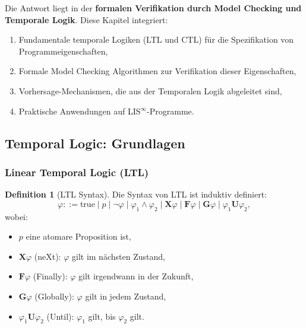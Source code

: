 \documentclass[a4paper,12pt]{article}
\theoremstyle{definition}
\newtheorem{definition}{Definition}
\begin{document}
	Die Antwort liegt in der \textbf{formalen Verifikation durch Model Checking und Temporale Logik}. Diese Kapitel integriert:
	
	\begin{enumerate}
		\item Fundamentale temporale Logiken (LTL und CTL) für die Spezifikation von Programmeigenschaften,
		\item Formale Model Checking Algorithmen zur Verifikation dieser Eigenschaften,
		\item Vorhersage-Mechanismen, die aus der Temporalen Logik abgeleitet sind,
		\item Praktische Anwendungen auf LIS$^{\infty}$-Programme.
	\end{enumerate}
	
	\subsection{Temporal Logic: Grundlagen}
	
	\subsubsection{Linear Temporal Logic (LTL)}
	
	\begin{definition}[LTL Syntax]
		\label{def:ltl_syntax}
		Die Syntax von LTL ist induktiv definiert:
		\[
		\varphi ::= \text{true} \mid p \mid \neg \varphi \mid \varphi_1 \land \varphi_2 \mid \mathbf{X}\varphi \mid \mathbf{F}\varphi \mid \mathbf{G}\varphi \mid \varphi_1 \mathbf{U} \varphi_2,
		\]
		wobei:
		\begin{itemize}
			\item $p$ eine atomare Proposition ist,
			\item $\mathbf{X}\varphi$ (neXt): $\varphi$ gilt im nächsten Zustand,
			\item $\mathbf{F}\varphi$ (Finally): $\varphi$ gilt irgendwann in der Zukunft,
			\item $\mathbf{G}\varphi$ (Globally): $\varphi$ gilt in jedem Zustand,
			\item $\varphi_1 \mathbf{U} \varphi_2$ (Until): $\varphi_1$ gilt, bis $\varphi_2$ gilt.
		\end{itemize}
	\end{definition}
	
\end{document}
